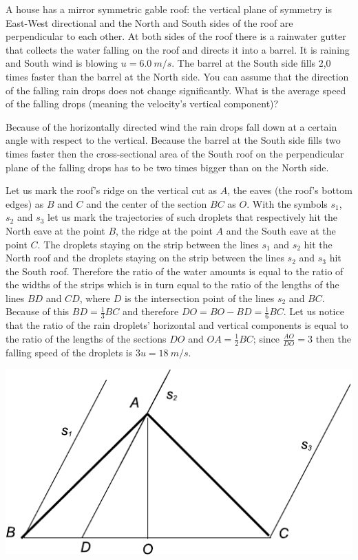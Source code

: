 {\ifEngStatement
A house has a mirror symmetric gable roof: the vertical plane of symmetry is East-West directional and the North and South sides of the roof are perpendicular to each other. At both sides of the roof there is a rainwater gutter that collects the water falling on the roof and directs it into a barrel. It is raining and South wind is blowing $u= \SI{6,0}{m/s}$. The barrel at the South side fills 2,0 times faster than the barrel at the North side. You can assume that the direction of the falling rain drops does not change significantly. What is the average speed of the falling drops (meaning the velocity’s vertical component)?
\fi


\ifEngHint
Because of the horizontally directed wind the rain drops fall down at a certain angle with respect to the vertical. Because the barrel at the South side fills two times faster then the cross-sectional area of the South roof on the perpendicular plane of the falling drops has to be two times bigger than on the North side.
\fi


\ifEngSolution
Let us mark the roof's ridge on the vertical cut as $A$, the eaves (the roof's bottom edges) as $B$ and $C$ and the center of the section $BC$ as $O$. With the symbols $s_1$, $s_2$ and $s_3$ let us mark the trajectories of such droplets that respectively hit the North eave at the point $B$, the ridge at the point $A$ and the South eave at the point $C$. The droplets staying on the strip between the lines $s_1$ and $s_2$ hit the North roof and the droplets staying on the strip between the lines $s_2$ and $s_3$ hit the South roof. Therefore the ratio of the water amounts is equal to the ratio of the widths of the strips which is in turn equal to the ratio of the lengths of the lines $BD$ and $CD$, where $D$ is the intersection point of the lines $s_2$ and $BC$. Because of this $BD=\frac 13 BC$ and therefore $DO=BO-BD=\frac 16 BC$. Let us notice that the ratio of the rain droplets' horizontal and vertical components is equal to the ratio of the lengths of the sections $DO$ and $OA=\frac 12 BC$; since $\frac {AO}{DO}=3$ then the falling speed of the droplets is $3u=\SI{18}{m/s}$.
\begin{center}
\includegraphics[width=0.5\linewidth]{2012-v2g-07-katus}
\end{center}
\fi
}
